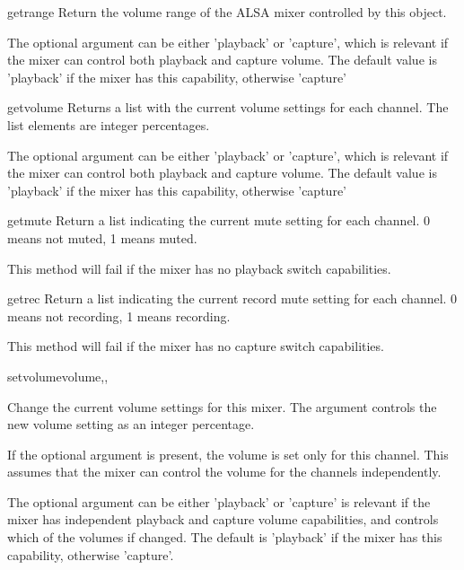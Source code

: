 \begin{methoddesc}[Mixer]{getrange}{}
  Return the volume range of the ALSA mixer controlled by this object.

  The optional  argument can be either 'playback' or
  'capture', which is relevant if the mixer can control both playback
  and capture volume.  The default value is 'playback' if the mixer
  has this capability, otherwise 'capture'

\end{methoddesc}

\begin{methoddesc}[Mixer]{getvolume}{}
  Returns a list with the current volume settings for each channel.
  The list elements are integer percentages.

  The optional  argument can be either 'playback' or
  'capture', which is relevant if the mixer can control both playback
  and capture volume. The default value is 'playback' if the mixer has
  this capability, otherwise 'capture'

\end{methoddesc}

\begin{methoddesc}[Mixer]{getmute}{}
  Return a list indicating the current mute setting for each channel.
  0 means not muted, 1 means muted.

  This method will fail if the mixer has no playback switch
  capabilities.
\end{methoddesc}

\begin{methoddesc}[Mixer]{getrec}{}
  Return a list indicating the current record mute setting for each
  channel. 0 means not recording, 1 means recording.

  This method will fail if the mixer has no capture switch
  capabilities.
\end{methoddesc}

\begin{methoddesc}[Mixer]{setvolume}{volume,,
    }

  Change the current volume settings for this mixer. The 
  argument controls the new volume setting as an integer percentage.

  If the optional argument  is present, the volume is set
  only for this channel. This assumes that the mixer can control the
  volume for the channels independently.

  The optional  argument can be either 'playback' or
  'capture' is relevant if the mixer has independent playback and
  capture volume capabilities, and controls which of the volumes if
  changed. The default is 'playback' if the mixer has this capability,
  otherwise 'capture'.
\end{methoddesc}

